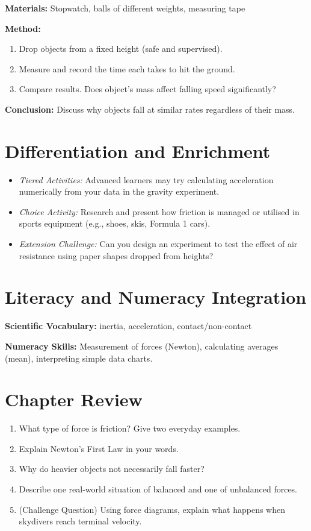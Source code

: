 \documentclass[justified]{tufte-book}
\begin{document}
\textbf{Materials:} Stopwatch, balls of different weights, measuring tape

\textbf{Method:}

\begin{enumerate}
  \item Drop objects from a fixed height (safe and supervised).
  \item Measure and record the time each takes to hit the ground.
  \item Compare results. Does object's mass affect falling speed significantly?
\end{enumerate}

\textbf{Conclusion:} Discuss why objects fall at similar rates regardless of their mass.

\section{Differentiation and Enrichment}

\begin{itemize}
  \item \textit{Tiered Activities:} Advanced learners may try calculating acceleration numerically from your data in the gravity experiment.

  \item \textit{Choice Activity:} Research and present how friction is managed or utilised in sports equipment (e.g., shoes, skis, Formula 1 cars).

  \item \textit{Extension Challenge:} Can you design an experiment to test the effect of air resistance using paper shapes dropped from heights?
\end{itemize}

\section{Literacy and Numeracy Integration}
\textbf{Scientific Vocabulary:} inertia, acceleration, contact/non-contact

\textbf{Numeracy Skills:} Measurement of forces (Newton), calculating averages (mean), interpreting simple data charts.

\section*{Chapter Review}

\begin{enumerate}
  \item What type of force is friction? Give two everyday examples.
  \item Explain Newton's First Law in your words.
  \item Why do heavier objects not necessarily fall faster?
  \item Describe one real-world situation of balanced and one of unbalanced forces.
  \item (Challenge Question) Using force diagrams, explain what happens when skydivers reach terminal velocity.
\end{enumerate}
\end{document}
